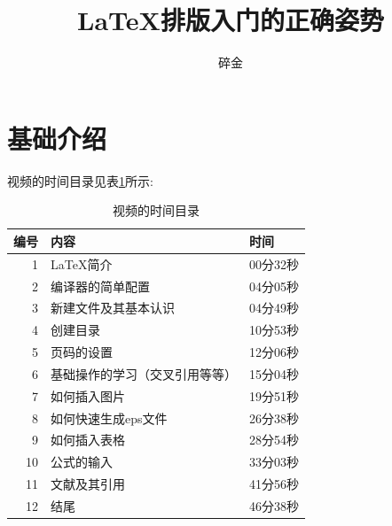 \documentclass[]{article}	%
\title{\LaTeX 排版入门的正确姿势}
\author{碎金}
\begin{document}
\maketitle	%
\thispagestyle{empty}	%
\clearpage	%

\setcounter{page}{1}	%


\clearpage
\tableofcontents
\clearpage

\setcounter{page}{1}

\section{基础介绍}
\label{sec.intro}

视频的时间目录见表\ref{tab.tableoftimecontents}所示:
\begin{table}[htbp]
	\centering
	\caption{视频的时间目录}
	\begin{tabular}{rll}
		\toprule
		编号 & 内容 & 时间 \\
		\midrule
		1     & LaTeX简介 & 00分32秒 \\
		2     & 编译器的简单配置 & 04分05秒 \\
		3     & 新建文件及其基本认识 & 04分49秒 \\
		4     & 创建目录  & 10分53秒 \\
		5     & 页码的设置 & 12分06秒 \\
		6     & 基础操作的学习（交叉引用等等） & 15分04秒 \\
		7     & 如何插入图片 & 19分51秒 \\
		8     & 如何快速生成eps文件 & 26分38秒 \\
		9     & 如何插入表格 & 28分54秒 \\
		10    & 公式的输入 & 33分03秒 \\
		11    & 文献及其引用 & 41分56秒 \\
		12    & 结尾    & 46分38秒 \\
		\bottomrule
	\end{tabular}%
	\label{tab.tableoftimecontents}%
\end{table}%
\end{document}
